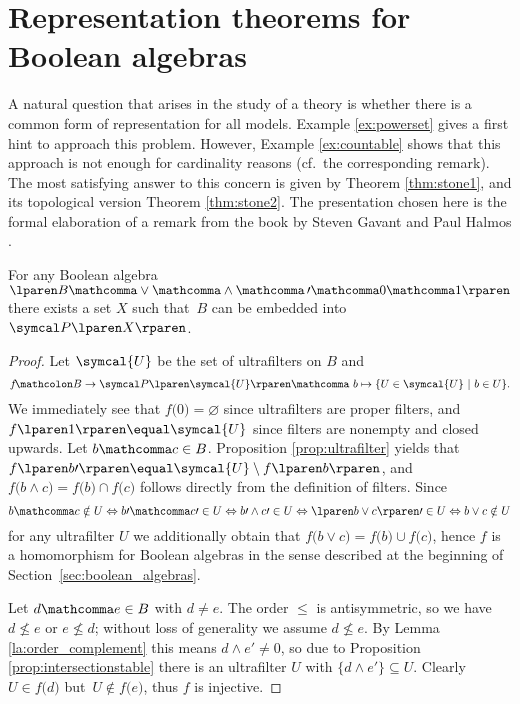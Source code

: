 \section{Representation theorems for Boolean algebras}
\label{sec:representation_theorems}

A natural question that arises in the study of a theory is
whether there is a common form of representation for all models.
Example \ref{ex:powerset} gives a first hint to approach this problem.
However, Example \ref{ex:countable} shows
that this approach is not enough for cardinality reasons
(cf.~the corresponding remark).
The most satisfying answer to this concern is given by Theorem \ref{thm:stone1},
and its topological version Theorem \ref{thm:stone2}.
The presentation chosen here is the formal elaboration
of a remark from the book 
by Steven Gavant and Paul Halmos \cite[p.~190]{halmos:boolean_algebras}.

\medskip

\begin{theorem}
\label{thm:stone1}
  For any Boolean algebra
  $\lparen B \mathcomma \vee \mathcomma \wedge \mathcomma \, \prime
  \mathcomma 0 \mathcomma 1 \rparen$
  there exists a set $X$ such that~$B$ can be embedded into $\Po{X}$.
\end{theorem}

\begin{proof}
  Let $\symcal{U}$ be the set of ultrafilters on $B$ and
  \[
    f
    \! \mathcolon
    B
    \rightarrow
    \Po{ \symcal{U} }
    \mathcomma \
    b
    \mapsto
    \lbrace
      U \in \symcal{U}
    \pipe
      b \in U
    \rbrace.
  \]
  We immediately see that
  $f \lparen 0 \rparen \equal \varnothing$
  since ultrafilters are proper filters,
  and $f \lparen 1 \rparen \equal \symcal{U}$
  since filters are nonempty and closed upwards.
  Let $b \mathcomma c \in B$.
  Proposition \ref{prop:ultrafilter} yields
  that~$f \lparen b \prime \rparen
  \equal \symcal{U} \setminus f \lparen b \rparen$,
  and
  $f \lparen b \wedge c \rparen
  \equal f \lparen b \rparen \cap f \lparen c \rparen$
  follows directly from the definition of filters.
  Since
  \[
    b \mathcomma c \notin U
    \Leftrightarrow
    b \prime \mathcomma c \prime \in U
    \Leftrightarrow
    b \prime \wedge c \prime \in U
    \Leftrightarrow
    \lparen b \vee c \rparen \prime \in U
    \Leftrightarrow
    b \vee c \notin U
  \]
  for any ultrafilter $U$ we additionally obtain that
  $f \lparen b \vee c \rparen
  \equal f \lparen b \rparen \cup f \lparen c \rparen$,
  hence $f$ is a homomorphism for Boolean algebras
  in the sense described at the beginning of
  Section~\ref{sec:boolean_algebras}.

  Let $d \mathcomma e \in B$ with $d \ne e$.
  The order $\leq$ is antisymmetric,
  so we have $d \nleq e$ or $e \nleq d$;
  without loss of generality we assume $d \nleq e$.
  By Lemma \ref{la:order_complement} this means
  $d \wedge e \prime \ne 0$,
  so due to Proposition \ref{prop:intersectionstable}
  there is an ultrafilter $U$ with
  $\lbrace d \wedge e \prime \rbrace \subseteq U$.
  Clearly $U \in f \lparen d \rparen$
  but~$U \notin f \lparen e \rparen$,
  thus $f$ is injective.
\end{proof}

